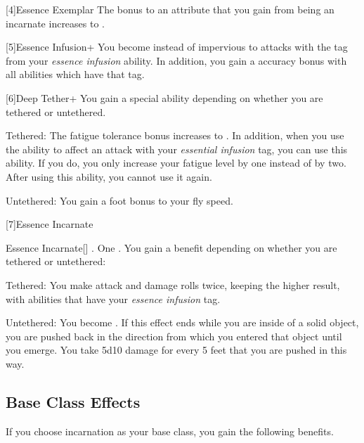     [4]{Essence Exemplar} The bonus to an attribute that you gain from being an incarnate increases to .

    [5]{Essence Infusion+} You become  instead of impervious to attacks with the tag from your \textit{essence infusion} ability.
      In addition, you gain a  accuracy bonus with all abilities which have that tag.

    [6]{Deep Tether+} You gain a special ability depending on whether you are tethered or untethered.
      \begin{raggeditemize}
        \item Tethered: The fatigue tolerance bonus increases to .
          In addition, when you use the  ability to affect an attack with your \textit{essential infusion} tag, you can use this ability.
          If you do, you only increase your fatigue level by one instead of by two.
          After using this ability, you  cannot use it again.
        \item Untethered: You gain a  foot bonus to your fly speed.
      \end{raggeditemize}

    [7]{Essence Incarnate}
      \begin{magicalactiveability}{Essence Incarnate}[]
        \abilityusagetime {}.
        \abilitycost One .
        \rankline
        You gain a benefit depending on whether you are tethered or untethered:
        \begin{raggeditemize}
          \item Tethered: You  make attack and damage rolls twice, keeping the higher result, with abilities that have your \textit{essence infusion} tag.
          \item Untethered: You  become .
            If this effect ends while you are inside of a solid object, you are pushed back in the direction from which you entered that object until you emerge.
            You take 5d10 damage for every 5 feet that you are pushed in this way.
        \end{raggeditemize}

        {}
      \end{magicalactiveability}

  \subsection{Base Class Effects}
    If you choose incarnation as your base class, you gain the following benefits.

